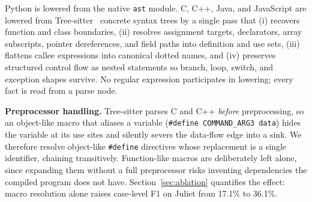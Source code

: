 \documentclass[10pt,conference]{IEEEtran}
\begin{document}
Python is lowered from the native \texttt{ast} module. C, C++, Java, and
JavaScript are lowered from Tree-sitter~\cite{treesitter} concrete syntax
trees by a single pass that (i) recovers function and class boundaries, (ii) resolves
assignment targets, declarators, array subscripts, pointer dereferences, and
field paths into definition and use sets, (iii) flattens callee expressions
into canonical dotted names, and (iv) preserves structured control flow as
nested statements so branch, loop, switch, and exception shapes survive.
No regular expression participates in lowering; every fact is read from a
parse node.

\textbf{Preprocessor handling.} Tree-sitter parses C and C++ \emph{before}
preprocessing, so an object-like macro that aliases a variable
(\texttt{\#define COMMAND\_ARG3 data}) hides the variable at its use sites and
silently severs the data-flow edge into a sink. We therefore resolve
object-like \texttt{\#define} directives whose replacement is a single
identifier, chaining transitively. Function-like macros are deliberately left
alone, since expanding them without a full preprocessor risks inventing
dependencies the compiled program does not have. Section~\ref{sec:ablation}
quantifies the effect: macro resolution alone raises case-level F1 on Juliet
from 17.1\% to 36.1\%.
\end{document}
